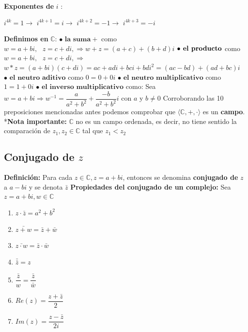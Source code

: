 \documentclass[12pt]{article}
\begin{document}
\noindent \textbf{Exponentes de }$i$ :
\begin{center}
    $i^{4k}=1\rightarrow$ 
    $i^{4k+1}=i\rightarrow$
    $i^{4k+2}=-1\rightarrow$
    $i^{4k+3}=-i$     
\end{center}
\newpage
\noindent \textbf{Definimos en } $\mathbb{C}$:\newline
$\bullet \textbf{ la suma} +$ como $w=a+bi,\text{ }z=c+di, \Rightarrow w+z=(a+c)+(b+d)i$ \newline
$\bullet \textbf{ el producto} \*$ como $w=a+bi,\text{ }z=c+di, \Rightarrow$ \newline
$w*z=(a+bi)(c+di)=ac+adi+bci+bdi^2=(ac-bd)+(ad+bc)i$\newline
$\bullet \textbf{ el neutro aditivo} $ como $0=0+0i$\newline
$\bullet \textbf{ el neutro multiplicativo} $ como $1=1+0i$\newline
$\bullet \textbf{ el inverso multiplicativo} $ como:\newline
Sea $w=a+bi \Rightarrow w^{-1}=\dfrac{a}{a^2+b^2}+\dfrac{-b}{a^2+b^2}i\text{ con } a$ y $b\not=0$\newline
Corroborando las 10 preposiciones mencionadas antes podemos comprobar que $\langle\mathbb{C}, +,\cdot\rangle$ es un \textbf{campo}.\newline
*\textbf{Nota importante: } $\mathbb{C}$ no es un campo ordenada, es decir, no tiene sentido la comparación
de $z_1,z_2\in \mathbb{C}$ tal que $z_1 < z_2$
\subsection*{Conjugado de $z$}
\noindent \textbf{Definición: }Para cada $z\in\mathbb{C}, z=a+bi$, entonces se denomina
\textbf{conjugado de }$z$ a $a-bi$ y se denota $\bar{z}$
\newline
\newline
\textbf{Propiedades del conjugado de un complejo:}\newline
\noindent Sea $z=a+bi,w\in\mathbb{C}$
\begin{enumerate}
    \item $z \cdot \bar{z}=a^2+b^2$
    \item $\bar{z+w}=\bar{z}+\bar{w}$
    \item $\bar{z\cdot w}=\bar{z}\cdot\bar{w}$
    \item $\bar{\bar{z}}=z$
    \item $\bar{\dfrac{z}{w}}=\dfrac{\bar{z}}{\bar{w}}$
    \item $Re(z)=\dfrac{z+\bar{z}}{2}$
    \item $Im(z)=\dfrac{z-\bar{z}}{2i}$
\end{enumerate}
\newpage
\end{document}
